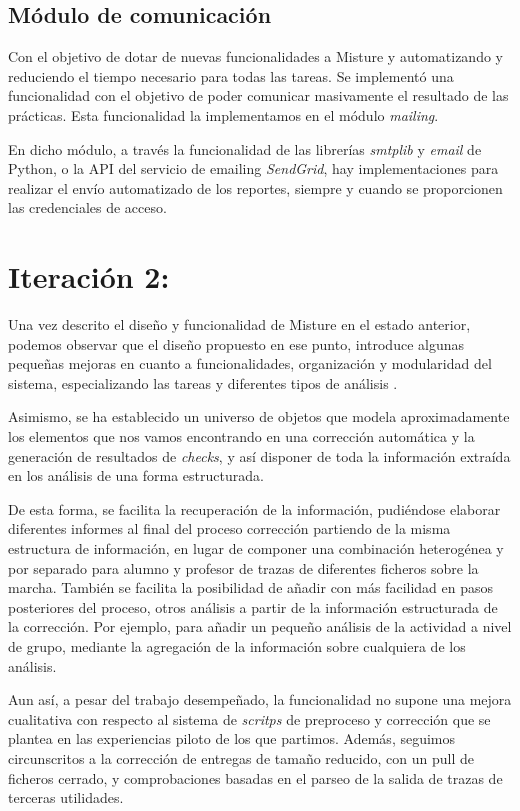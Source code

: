 \subsection{Módulo de comunicación}

Con el objetivo de dotar de nuevas funcionalidades a Misture y automatizando y reduciendo el tiempo necesario para todas las tareas. Se implementó una funcionalidad con el objetivo de poder comunicar masivamente el resultado de las prácticas. Esta funcionalidad la implementamos en el módulo \textit{mailing}.

En dicho módulo, a través la funcionalidad de las librerías \textit{smtplib} y \textit{email} de Python, o la API del servicio de emailing \textit{SendGrid}, hay implementaciones para realizar el envío automatizado de los reportes, siempre y cuando se proporcionen las credenciales de acceso.	\newpage %

\section{Iteración 2:} 
\label{subsec:iteracion2}

Una vez descrito el diseño y funcionalidad de Misture en el estado anterior, podemos observar que el diseño propuesto en ese punto, introduce algunas pequeñas mejoras en cuanto a funcionalidades, organización y modularidad del sistema, especializando las tareas y diferentes tipos de análisis .


Asimismo, se ha establecido un universo de objetos que modela aproximadamente los elementos que nos vamos encontrando en una corrección automática y la generación de resultados de \textit{checks}, y así disponer de toda la información extraída en los análisis de una forma estructurada.


De esta forma, se facilita la recuperación de la información, pudiéndose elaborar diferentes informes al final del proceso corrección partiendo de la misma estructura de información, en lugar de componer una combinación heterogénea y por separado para alumno y profesor de trazas de diferentes ficheros sobre la marcha. También se facilita la posibilidad de añadir con más facilidad en pasos posteriores del proceso, otros análisis a partir de la información estructurada de la corrección. Por ejemplo, para añadir un pequeño análisis de la actividad a nivel de grupo, mediante la agregación de la información sobre cualquiera de los análisis.


Aun así, a pesar del trabajo desempeñado, la funcionalidad no supone una mejora cualitativa con respecto al sistema de \textit{scritps} de preproceso y corrección que se plantea en las experiencias piloto de los que partimos. Además, seguimos circunscritos a la corrección de entregas de tamaño reducido, con un pull de ficheros cerrado, y comprobaciones basadas en el parseo de la salida de trazas de terceras utilidades.



